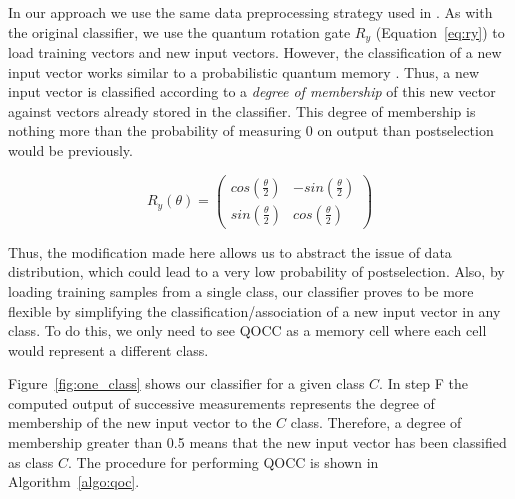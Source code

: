 \documentclass{esannV2}
\begin{document}
In our approach we use the same data preprocessing strategy used in \cite{schuld2017implementing}. As with the original classifier, we use the quantum rotation gate $R_{y}$ (Equation~\ref{eq:ry}) to load training vectors and new input vectors. However, the classification of a new input vector works similar to a probabilistic quantum memory \cite{trugenberger2001probabilistic}. Thus, a new input vector is classified according to a \textit{degree of membership} of this new vector against vectors already stored in the classifier. This degree of membership is nothing more than the probability of measuring 0 on output than postselection would be previously.

\begin{equation}\label{eq:ry}
    R_{y}(\theta)=\begin{pmatrix}
cos\left ( \frac{\theta}{2} \right ) & -sin\left ( \frac{\theta}{2} \right )\\
sin\left ( \frac{\theta}{2} \right ) & cos\left ( \frac{\theta}{2} \right )
\end{pmatrix}
\end{equation}

Thus, the modification made here allows us to abstract the issue of data distribution, which could lead to a very low probability of postselection. Also, by loading training samples from a single class, our classifier proves to be more flexible by simplifying the classification/association of a new input vector in any class. To do this, we only need to see QOCC as a memory cell where each cell would represent a different class.

Figure~\ref{fig:one_class} shows our classifier for a given class $C$. In step F the computed output of successive measurements represents the degree of membership of the new input vector to the $C$ class.
Therefore, a degree of membership greater than 0.5 means that the new input vector has been classified as class $C$. The procedure for performing QOCC is shown in Algorithm~\ref{algo:qoc}.
\end{document}
